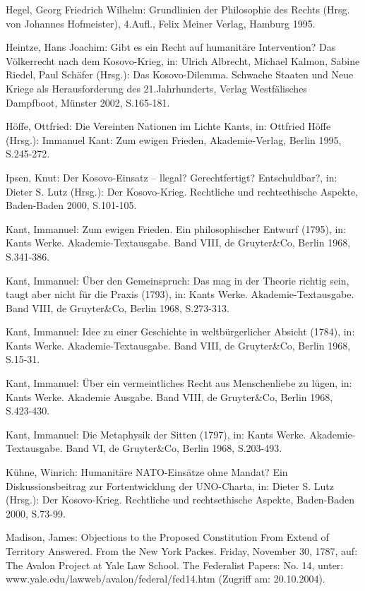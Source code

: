 \documentclass[12pt,a4paper,ngerman]{article}
\begin{document}
{Hegel, Georg Friedrich Wilhelm: Grundlinien der Philosophie des Rechts
(Hrsg. von Johannes Hofmeister), 4.Aufl., Felix Meiner Verlag, Hamburg
1995.

Heintze, Hans Joachim: Gibt es ein Recht auf humanitäre Intervention?
Das Völkerrecht nach dem Kosovo-Krieg, in: Ulrich Albrecht, Michael
Kalmon, Sabine Riedel, Paul Schäfer (Hrsg.): Das Kosovo-Dilemma.
Schwache Staaten und Neue Kriege als Herausforderung des
21.Jahrhunderts, Verlag Westfälisches Dampfboot, Münster 2002,
S.165-181.

Höffe, Ottfried: Die Vereinten Nationen im Lichte Kants, in:
Ottfried Höffe (Hrsg.): Immanuel Kant: Zum ewigen Frieden,
Akademie-Verlag, Berlin 1995, S.245-272.

Ipsen, Knut: Der Kosovo-Einsatz -- llegal?  Gerechtfertigt?
Entschuldbar?, in: Dieter S. Lutz (Hrsg.): Der Kosovo-Krieg.
Rechtliche und rechtsethische Aspekte, Baden-Baden 2000, S.101-105.

Kant, Immanuel: Zum ewigen Frieden. Ein philosophischer Entwurf
(1795), in: Kants Werke. Akademie-Textausgabe. Band VIII, de
Gruyter\&Co, Berlin 1968, S.341-386.

Kant, Immanuel: Über den Gemeinspruch: Das mag in der Theorie
richtig sein, taugt aber nicht für die Praxis (1793), in: Kants Werke.
Akademie-Textausgabe. Band VIII, de Gruyter\&Co, Berlin 1968, S.273-313.

Kant, Immanuel: Idee zu einer Geschichte in weltbürgerlicher
Absicht (1784), in: Kants Werke. Akademie-Textausgabe. Band VIII, de
Gruyter\&Co, Berlin 1968, S.15-31.

Kant, Immanuel: Über ein vermeintliches Recht aus Menschenliebe zu
lügen, in: Kants Werke. Akademie Ausgabe. Band VIII, de Gruyter\&Co,
Berlin 1968, S.423-430.

Kant, Immanuel: Die Metaphysik der Sitten (1797), in: Kants
Werke. Akademie-Textausgabe. Band VI, de Gruyter\&Co, Berlin 1968,
S.203-493.

Kühne, Winrich: Humanitäre NATO-Einsätze ohne Mandat? Ein
Diskussionsbeitrag zur Fortentwicklung der UNO-Charta, in: Dieter S.
Lutz (Hrsg.): Der Kosovo-Krieg. Rechtliche und rechtsethische Aspekte,
Baden-Baden 2000, S.73-99.

Madison, James: Objections to the Proposed Constitution From Extend of
Territory Answered. From the New York Packes. Friday, November 30,
1787, auf: The Avalon Project at Yale Law School. The Federalist
Papers: No. 14, unter: www.yale.edu/lawweb/avalon/federal/fed14.htm
(Zugriff am: 20.10.2004).

}
\end{document}
